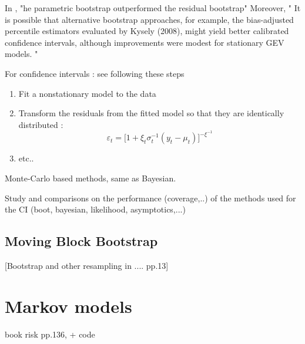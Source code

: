In \citet{cannon_flexible_2010}, "he parametric bootstrap outperformed the residual bootstrap"
Moreover, " It is possible that alternative bootstrap approaches, for example, the bias-adjusted percentile estimators evaluated by Kysely
(2008), might yield better calibrated confidence intervals, although improvements were modest for stationary GEV models. "


For confidence intervals : see \citet[pp.681]{cannon_flexible_2010} 
following these steps

\begin{enumerate}
	\item Fit a nonstationary model to the data
	\item Transform the residuals from the fitted model so that they are identically distributed :
	\begin{equation}
	\varepsilon_t=\bigg[1+\xi_t\sigma^{-1}_t(y_t-\mu_t)\bigg]^{-\xi^{-1}}
	\end{equation}
	\item etc..
\end{enumerate}

Monte-Carlo based methods, same as Bayesian.

Study and comparisons on the performance (coverage,..) of the methods used for the CI (boot, bayesian, likelihood, asymptotics,...)
\subsection{Moving Block Bootstrap}

[Bootstrap and other resampling in .... pp.13]


\section{Markov models}
book risk pp.136, \cite{shaby_markov-switching_2016} + code


